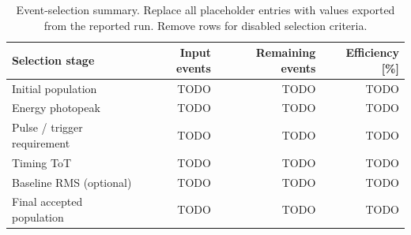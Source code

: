\begin{table}[H]
    \centering
    \caption{Event-selection summary. Replace all placeholder entries with values exported from the reported run. Remove rows for disabled selection criteria.}
    \label{tab:event-selection}
    \begin{tabular}{lrrr}
        \toprule
        Selection stage & Input events & Remaining events & Efficiency [\%] \\
        \midrule
        Initial population & TODO & TODO & TODO \\
        Energy photopeak & TODO & TODO & TODO \\
        Pulse / trigger requirement & TODO & TODO & TODO \\
        Timing ToT & TODO & TODO & TODO \\
        Baseline RMS (optional) & TODO & TODO & TODO \\
        Final accepted population & TODO & TODO & TODO \\
        \bottomrule
    \end{tabular}
\end{table}
